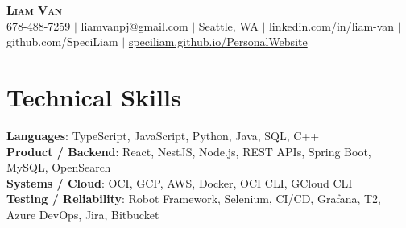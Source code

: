 \documentclass[letterpaper,11pt]{article}
\begin{document}

%
\begin{center}
    \textbf{\Huge \scshape Liam Van} \\ \vspace{1pt}
    \small 678-488-7259 $|$ \small {liamvanpj@gmail.com} $|$ Seattle, WA
 {{$|$ linkedin.com/in/liam-van} {$|$ github.com/SpeciLiam} {$|$ \href{https://speciliam.github.io/PersonalWebsite}{speciliam.github.io/PersonalWebsite}}}

\end{center}

\section{Technical Skills}
 \begin{itemize}[leftmargin=0.15in, label={}]
    \small{\item{
     \textbf{Languages}{: TypeScript, JavaScript, Python, Java, SQL, C++} \\
     \textbf{Product / Backend}{: React, NestJS, Node.js, REST APIs, Spring Boot, MySQL, OpenSearch} \\
     \textbf{Systems / Cloud}{: OCI, GCP, AWS, Docker, OCI CLI, GCloud CLI} \\
     \textbf{Testing / Reliability}{: Robot Framework, Selenium, CI/CD, Grafana, T2, Azure DevOps, Jira, Bitbucket} \\
    }}
 \end{itemize}
%
\end{document}
